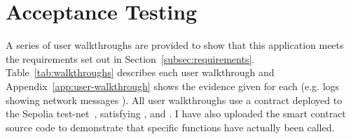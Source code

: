 
\section{Acceptance Testing}\label{sec:acc-tests}

A series of user walkthroughs are provided to show that this application meets the requirements set out in Section~\ref{subsec:requirements}. Table~\ref{tab:walkthroughs} describes each user walkthrough and Appendix~\ref{app:user-walkthrough} shows the evidence given for each (e.g. logs showing network messages ). 
All user walkthroughs use a contract deployed to the Sepolia test-net~\cite{etherscanio_deployed_nodate}, satisfying ,  and . I have also uploaded the smart contract source code to demonstrate that specific functions have actually been called. 

\newcommand{\p}[1]{$P_{#1}$}
\newcommand{\g}[1]{$G_{#1}$}

